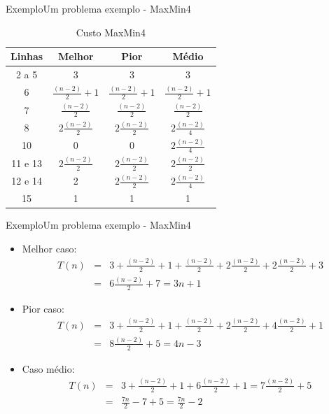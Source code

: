 \documentclass[aspectratio=169]{beamer}
\begin{document}
\begin{frame}{Exemplo}{Um problema exemplo - MaxMin4}
\begin{table}[]
\centering
\caption{Custo MaxMin4}
\label{Custo MaxMin4}
\begin{tabular}{c|ccc}
Linhas  &  Melhor  &  Pior  &  Médio  \\
\hline
2 a 5   & 3            &    3    &  3 \\
6       & $\frac{(n-2)}{2} + 1$  & $\frac{(n-2)}{2} + 1$     & $\frac{(n-2)}{2} + 1$ \\
7       & $\frac{(n-2)}{2}$       & $\frac{(n-2)}{2}$        & $\frac{(n-2)}{2}$  \\
8       & $2\frac{(n-2)}{2}$ & $2\frac{(n-2)}{2}$  & $2\frac{(n-2)}{4}$  \\
10      & 0 & 0 &  $2\frac{(n-2)}{4}$ \\
11 e 13 & $2\frac{(n-2)}{2}$ & $2\frac{(n-2)}{2}$& $2\frac{(n-2)}{2}$ \\
12 e 14 & 2 &  $2\frac{(n-2)}{2}$ &  $2\frac{(n-2)}{4}$ \\
15      & 1 & 1 & 1 \\
\end{tabular}
\end{table} 
 
\end{frame}


\begin{frame}{Exemplo}{Um problema exemplo - MaxMin4}
\begin{itemize}
\item Melhor caso:
\begin{eqnarray}
T(n) &=& 3 + \frac{(n-2)}{2} + 1 + \frac{(n-2)}{2} + 2\frac{(n-2)}{2} + 2 \frac{(n-2)}{2} + 3\nonumber \\
     &=& 6 \frac{(n-2)}{2} + 7 = 3n+1\nonumber 
\end{eqnarray}
\item Pior caso:
\begin{eqnarray}
T(n) &=& 3 + \frac{(n-2)}{2} + 1 + \frac{(n-2)}{2} + 2\frac{(n-2)}{2} + 4\frac{(n-2)}{2} + 1\nonumber \\
     &=& 8\frac{(n-2)}{2} + 5 = 4n -3\nonumber 
\end{eqnarray}
\item Caso médio:
\begin{eqnarray}
T(n) &=& 3 + \frac{(n-2)}{2} + 1 + 6\frac{(n-2)}{2} + 1 = 7\frac{(n-2)}{2} +5 \nonumber \\
     &=& \frac{7n}{2} -7 +5 = \frac{7n}{2} -2 \nonumber \\
\end{eqnarray}
\end{itemize}
\end{frame}
\end{document}
